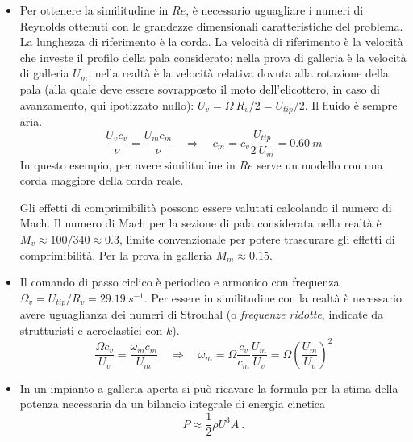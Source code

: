 \begin{itemize}
\item
Per ottenere la similitudine in $Re$, è necessario uguagliare i numeri di Reynolds 
 ottenuti con le grandezze dimensionali caratteristiche del problema.
 La lunghezza di riferimento è la corda. La velocità di riferimento è la velocità
 che investe il profilo della pala considerato; nella prova di galleria è la velocità
 di galleria $U_m$, nella realtà è la velocità relativa dovuta alla rotazione della
 pala (alla quale deve essere sovrapposto il moto dell'elicottero, in caso di avanzamento,
 qui ipotizzato nullo): $U_v = \Omega \ R_v/2 = U_{tip}/2$. Il fluido è sempre aria.
\begin{equation}
  \dfrac{U_v c_v}{\nu} =   \dfrac{U_m c_m}{\nu} \quad \Rightarrow \quad
  c_m = c_v \dfrac{U_{tip}}{2 \ U_m} = 0.60 \ m
\end{equation}
 In questo esempio, per avere similitudine in $Re$ serve un modello con una
 corda maggiore della corda reale.

Gli effetti di comprimibilità possono essere valutati calcolando il numero di Mach.
 Il numero di Mach per la sezione di pala considerata nella realtà è 
 $M_v \approx 100 / 340 \approx 0.3$, limite convenzionale per potere trascurare gli
 effetti di comprimibilità. Per la prova in galleria $M_m \approx 0.15$.

\item
Il comando di passo ciclico è periodico e armonico con frequenza 
 $\Omega_v = U_{tip}/R_v = 29.19 \ s^{-1}$. Per essere in similitudine con la realtà
 è necessario avere uguaglianza dei numeri di Strouhal (o \textit{frequenze ridotte},
 indicate da strutturisti e aeroelastici con $k$).
\begin{equation}
 \dfrac{\Omega c_v}{U_v} = \dfrac{\omega_m c_m}{U_m} \quad \Rightarrow \quad
  \omega_m = \Omega \dfrac{c_v}{c_m}\dfrac{U_m}{U_v} = \Omega \left(\dfrac{U_m}{U_v}\right)^2
\end{equation}

\item
In un impianto a galleria aperta si può ricavare la formula per la stima della potenza
 necessaria da un bilancio integrale di energia cinetica
\begin{equation}
 P \approx \dfrac{1}{2}\rho U^3 A \ .
\end{equation}
\end{itemize}



